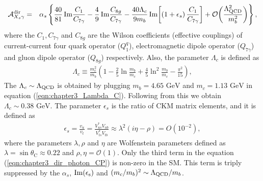 \begin{eqnarray}\label{eqn:chapter3_dir_photon_CP}
   {\cal A}_{X_s\gamma}^{\rm dir}
   &=& \alpha_s\,\Bigg\{ \frac{40}{81}\,\mbox{Im}\frac{C_1}{C_{7\gamma}}
    - \frac49\,\mbox{Im}\frac{C_{8g}}{C_{7\gamma}}- \frac{40\Lambda_c}{9m_b}\,\mbox{Im}\bigg[(1+\epsilon_s)\,
    \frac{C_1}{C_{7\gamma}}\bigg] 
    + {\cal O}\bigg( \frac{\Lambda_{\rm QCD}^2}{m_b^2} \bigg) \Bigg\} \,, 
\end{eqnarray}
where the $C_1, C_{7\gamma}$ and $C_{8g}$ are the Wilson coefficients (effective couplings) of current-current four quark operator ($Q_{1}^q$), electromagnetic dipole operator ($Q_{7\gamma}$) and gluon dipole operator ($Q_{8g}$) respectively. Also, the parameter $\Lambda_{c}$ is defined as 
\begin{eqnarray}\label{eqn:chapter3_Lambda_C}
\Lambda_{c} \equiv \frac{m_{c}^{2}}{m_{b}}\left(1-\frac{2}{5} \ln \frac{m_{b}}{m_{c}}+\frac{4}{5} \ln ^{2} \frac{m_{b}}{m_{c}}-\frac{\pi^{2}}{15}\right),
\end{eqnarray}
The $\Lambda_c\sim\Lambda_{\rm{QCD}}$ is obtained by plugging $m_b=4.65\text{ GeV}$ and $m_c=1.13\text{ GeV}$ in equation (\ref{eqn:chapter3_Lambda_C}). Following from this we obtain $\Lambda_c\sim 0.38 \text{ GeV}$. The parameter $\epsilon_s$ is the ratio of CKM matrix elements, and it is defined as \cite{Kagan:1998bh}
\begin{eqnarray}
\epsilon_{s}=\frac{v_{u}}{v_{t}}=\frac{V_{u s}^{*} V_{u b}}{V_{t s}^{*} V_{t b}} \approx \lambda^{2}(i \eta-\rho)=O\left(10^{-2}\right),
\end{eqnarray}
where the parameters $\lambda,\rho$ and $\eta$ are Wolfenstein parameters defined as $\lambda=\sin \theta_{\mathrm{C}} \approx 0.22$ and $\rho, \eta=\mathcal{O}(1)$. Only the third term in the equation (\ref{eqn:chapter3_dir_photon_CP}) is non-zero in the SM. This term is triply suppressed by the $\alpha_s$, $\rm{Im}(\epsilon_s)$ and $(m_c/m_b)^2\sim \Lambda_{\rm{QCD}}/m_b$.

